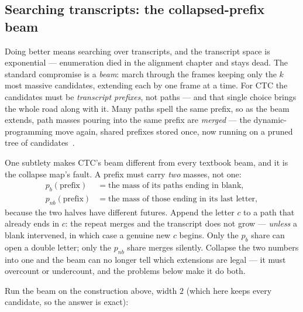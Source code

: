 \begin{narrative}
\section{Searching transcripts: the collapsed-prefix beam}

Doing better means searching over transcripts, and the transcript
space is exponential — enumeration died in the alignment chapter and
stays dead. The standard compromise is a \emph{beam}: march through
the frames keeping only the $k$ most massive candidates, extending
each by one frame at a time. For CTC the candidates must be
\emph{transcript prefixes}, not paths — and that single choice brings
the whole road along with it. Many paths spell the same prefix, so as
the beam extends, path masses pouring into the same prefix are
\emph{merged} — the dynamic-programming move again, shared prefixes
stored once, now running on a pruned tree of
candidates~\cite{deep_learning-hannun-sequence-modeling-with-ctc-distill-2017}.

One subtlety makes CTC's beam different from every textbook beam, and
it is the collapse map's fault. A prefix must carry \emph{two} masses,
not one:
\begin{align*}
  p_b(\text{prefix}) &= \text{the mass of its paths ending in blank},\\
  p_{nb}(\text{prefix}) &= \text{the mass of those ending in its last
  letter},
\end{align*}
because the two halves have different futures. Append the letter $c$
to a path that already ends in $c$: the repeat merges and the
transcript does not grow — \emph{unless} a blank intervened, in which
case a genuine new $c$ begins. Only the $p_b$ share can open a double
letter; only the $p_{nb}$ share merges silently. Collapse the two
numbers into one and the beam can no longer tell which extensions are
legal — it must overcount or undercount, and the problems below make
it do both.

Run the beam on the construction above, width $2$ (which here keeps
every candidate, so the answer is exact):


\end{narrative}
